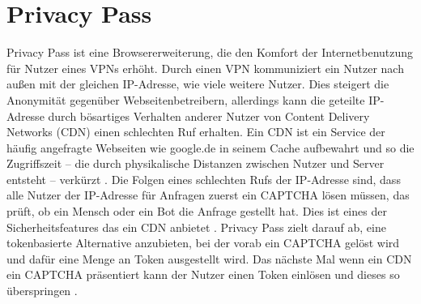 \documentclass[
	fontsize=11pt,
	headings=small,
	parskip=half,           %
	bibliography=totoc,
	numbers=noenddot,       %
	open=any,               %
]{scrreprt}
\begin{document}
\section{Privacy Pass}
\label{sec:privacy-pass}
Privacy Pass ist eine Browsererweiterung, die den Komfort der Internetbenutzung für Nutzer eines VPNs erhöht. Durch einen VPN kommuniziert ein Nutzer nach außen mit der gleichen IP-Adresse, wie viele weitere Nutzer. Dies steigert die Anonymität gegenüber Webseitenbetreibern, allerdings kann die geteilte IP-Adresse durch bösartiges Verhalten anderer Nutzer von Content Delivery Networks (CDN) einen schlechten Ruf erhalten. Ein CDN ist ein Service der häufig angefragte Webseiten wie google.de in seinem Cache aufbewahrt und so die Zugriffszeit -- die durch physikalische Distanzen zwischen Nutzer und Server entsteht -- verkürzt \cite{pp-cdn}. Die Folgen eines schlechten Rufs der IP-Adresse sind, dass alle Nutzer der IP-Adresse für Anfragen zuerst ein CAPTCHA lösen müssen, das prüft, ob ein Mensch oder ein Bot die Anfrage gestellt hat. Dies ist eines der Sicherheitsfeatures das ein CDN anbietet \cite{pp-Ghaznavi2021Content}. Privacy Pass zielt darauf ab, eine tokenbasierte Alternative anzubieten, bei der vorab ein CAPTCHA gelöst wird und dafür eine Menge an Token ausgestellt wird. Das nächste Mal wenn ein CDN ein CAPTCHA präsentiert kann der Nutzer einen Token einlösen und dieses so überspringen \cite{pp-davidson2018privacy}.

\end{document}
